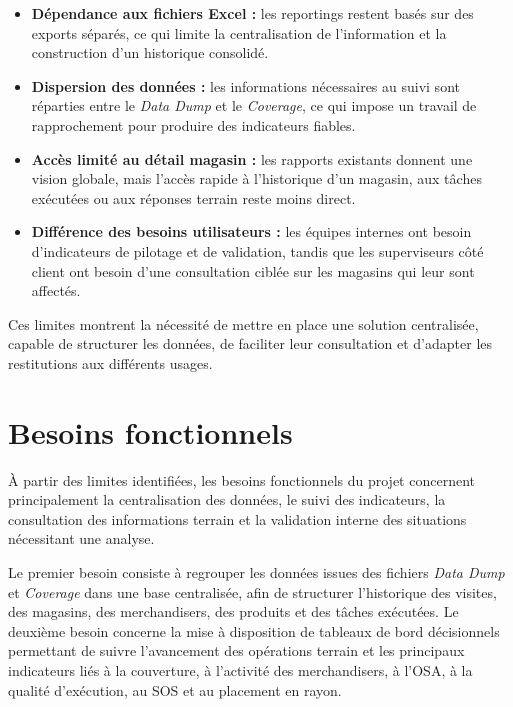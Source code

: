 \begin{itemize}
    \item \textbf{Dépendance aux fichiers Excel :} les reportings restent basés sur des exports séparés, ce qui limite la centralisation de l’information et la construction d’un historique consolidé.
    
    \item \textbf{Dispersion des données :} les informations nécessaires au suivi sont réparties entre le \textit{Data Dump} et le \textit{Coverage}, ce qui impose un travail de rapprochement pour produire des indicateurs fiables.
    
    \item \textbf{Accès limité au détail magasin :} les rapports existants donnent une vision globale, mais l’accès rapide à l’historique d’un magasin, aux tâches exécutées ou aux réponses terrain reste moins direct.
    
    \item \textbf{Différence des besoins utilisateurs :} les équipes internes ont besoin d’indicateurs de pilotage et de validation, tandis que les superviseurs côté client ont besoin d’une consultation ciblée sur les magasins qui leur sont affectés.
\end{itemize}

Ces limites montrent la nécessité de mettre en place une solution centralisée, capable de structurer les données, de faciliter leur consultation et d’adapter les restitutions aux différents usages.
 
\section{Besoins fonctionnels}

À partir des limites identifiées, les besoins fonctionnels du projet concernent principalement la centralisation des données, le suivi des indicateurs, la consultation des informations terrain et la validation interne des situations nécessitant une analyse.

Le premier besoin consiste à regrouper les données issues des fichiers \textit{Data Dump} et \textit{Coverage} dans une base centralisée, afin de structurer l’historique des visites, des magasins, des merchandisers, des produits et des tâches exécutées. Le deuxième besoin concerne la mise à disposition de tableaux de bord décisionnels permettant de suivre l’avancement des opérations terrain et les principaux indicateurs liés à la couverture, à l’activité des merchandisers, à l’OSA, à la qualité d’exécution, au SOS et au placement en rayon.

